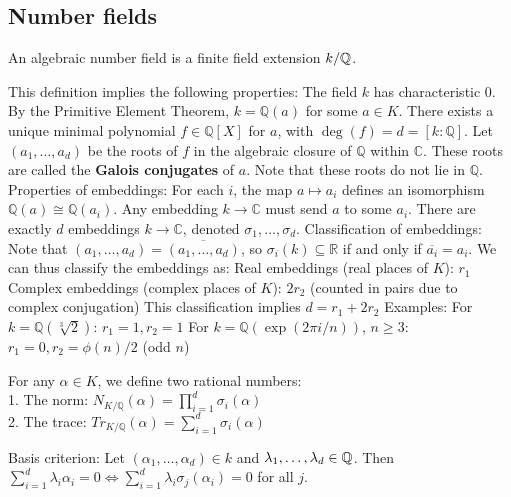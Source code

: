 \subsection{Number fields}
\begin{outline}
    \begin{definition}
        An algebraic number field is a finite field extension $k/\mathbb{Q}$. 
    \end{definition}
        \1 This definition implies the following properties:
            \2 The field $k$ has characteristic 0.
            \2 By the Primitive Element Theorem, $k = \mathbb{Q}(a)$ for some $a \in K$.
            \2 There exists a unique minimal polynomial $f \in \mathbb{Q}[X]$ for $a$, with $\deg(f) = d = [k:\mathbb{Q}]$.
        \1 Let $(a_1, \ldots, a_d)$ be the roots of $f$ in the algebraic closure of $\mathbb{Q}$ within $\mathbb{C}$. These roots are called the \textbf{Galois conjugates} of $a$. Note that these roots do not lie in $\mathbb{Q}$.
        \1 Properties of embeddings:
            \2 For each $i$, the map $a \mapsto a_i$ defines an isomorphism $\mathbb{Q}(a) \cong \mathbb{Q}(a_i)$.
            \2 Any embedding $k\rightarrow \mathbb{C}$ must send $a$ to some $a_i$.
            \2 There are exactly $d$ embeddings $k \rightarrow \mathbb{C}$, denoted $\sigma_1, \ldots, \sigma_d$.
        \1 Classification of embeddings:        
            \2 Note that $(a_1, \ldots, a_d) = \overline{(a_1, \ldots, a_d)}$, so $\sigma_i(k) \subseteq \mathbb{R}$ if and only if $\overline{a_i} = a_i$.
            \2 We can thus classify the embeddings as:
                \3 Real embeddings (real places of $K$): $r_1$
                \3 Complex embeddings (complex places of $K$): $2r_2$ (counted in pairs due to complex conjugation)
            \2 This classification implies $d = r_1 + 2r_2$
        \1 Examples:
            \2 For $k = \mathbb{Q}(\sqrt[3]{2})$: $r_1 = 1, r_2 = 1$
            \2 For $k = \mathbb{Q}(\exp(2\pi i/n))$, $n \geq 3$: $r_1 = 0, r_2 = \phi(n)/2$ (odd $n$)
    \0 \begin{definition}
        For any $\alpha \in K$, we define two rational numbers:\\
        1. The norm: $N_{K/\mathbb{Q}}(\alpha) = \prod_{i=1}^d \sigma_i(\alpha)$\\
        2. The trace: $Tr_{K/\mathbb{Q}}(\alpha) = \sum_{i=1}^d \sigma_i(\alpha)$
    \end{definition}
        \1 Basis criterion: Let $(\alpha_1,\ldots,\alpha_d)\in k$ and $\lambda_1,\ldots,\lambda_d\in\mathbb{Q}$. Then $\sum_{i=1}^d \lambda_i\alpha_i = 0 \iff \sum_{i=1}^d \lambda_i \sigma_j(\alpha_i)=0$ for all $j$. 

\end{outline}
